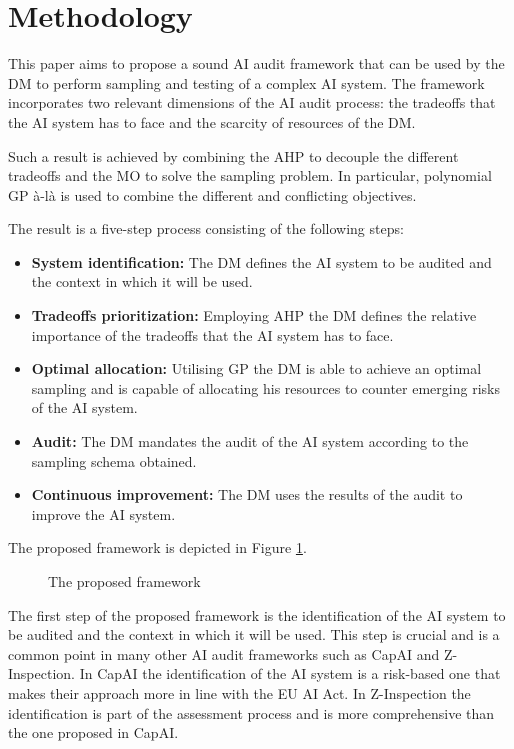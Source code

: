 \section{Methodology}
This paper aims to propose a sound AI audit framework that can be used by the DM to perform sampling and testing of a complex AI system.
The framework incorporates two relevant dimensions of the AI audit process: the tradeoffs that the AI system has to face and the scarcity of resources of the DM.

Such a result is achieved by combining the AHP to decouple the different tradeoffs and the MO to solve the sampling problem. 
In particular, polynomial GP à-là \cite{tayi_1985} is used to combine the different and conflicting objectives.

The result is a five-step process consisting of the following steps:
\begin{itemize}
    \item \textbf{System identification:} The DM defines the AI system to be audited and the context in which it will be used.
    \item \textbf{Tradeoffs prioritization:} Employing AHP the DM defines the relative importance of the tradeoffs that the AI system has to face.
    \item \textbf{Optimal allocation:} Utilising GP the DM is able to achieve an optimal sampling and is capable of allocating his resources to counter emerging risks of the AI system.
    \item \textbf{Audit:} The DM mandates the audit of the AI system according to the sampling schema obtained.
    \item \textbf{Continuous improvement:} The DM uses the results of the audit to improve the AI system.
\end{itemize}

The proposed framework is depicted in Figure \ref{fig:framework}.

\begin{figure}
    \centering
    \caption{The proposed framework}
    \label{fig:framework}
\end{figure}

The first step of the proposed framework is the identification of the AI system to be audited and the context in which it will be used.
This step is crucial and is a common point in many other AI audit frameworks such as CapAI and Z-Inspection.
In CapAI the identification of the AI system is a risk-based one that makes their approach more in line with the EU AI Act.
In Z-Inspection the identification is part of the assessment process and is more comprehensive than the one proposed in CapAI.

